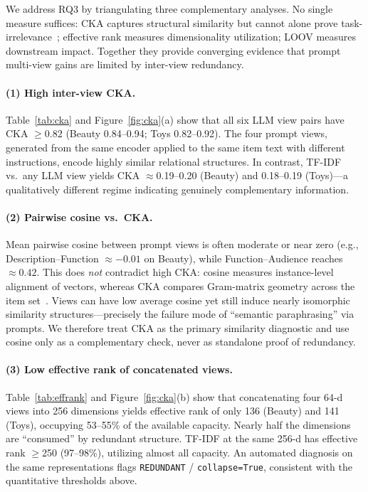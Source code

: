 \documentclass[sigconf,natbib=true,anonymous]{acmart}
\begin{document}
We address RQ3 by triangulating three complementary analyses.
No single measure suffices: CKA captures structural similarity but cannot alone prove task-irrelevance~\cite{kornblith2019cka}; effective rank measures dimensionality utilization; LOOV measures downstream impact.
Together they provide converging evidence that prompt multi-view gains are limited by inter-view redundancy.

\paragraph{(1) High inter-view CKA.}
Table~\ref{tab:cka} and Figure~\ref{fig:cka}(a) show that all six LLM view pairs have CKA $\ge 0.82$ (Beauty 0.84--0.94; Toys 0.82--0.92).
The four prompt views, generated from the same encoder applied to the same item text with different instructions, encode highly similar relational structures.
In contrast, TF-IDF vs.\ any LLM view yields CKA $\approx$0.19--0.20 (Beauty) and 0.18--0.19 (Toys)---a qualitatively different regime indicating genuinely complementary information.

\paragraph{(2) Pairwise cosine vs.\ CKA.}
Mean pairwise cosine between prompt views is often moderate or near zero (e.g., Description--Function $\approx -0.01$ on Beauty), while Function--Audience reaches $\approx 0.42$.
This does \emph{not} contradict high CKA: cosine measures instance-level alignment of vectors, whereas CKA compares Gram-matrix geometry across the item set~\cite{kornblith2019cka}.
Views can have low average cosine yet still induce nearly isomorphic similarity structures---precisely the failure mode of ``semantic paraphrasing'' via prompts.
We therefore treat CKA as the primary similarity diagnostic and use cosine only as a complementary check, never as standalone proof of redundancy.

\paragraph{(3) Low effective rank of concatenated views.}
Table~\ref{tab:effrank} and Figure~\ref{fig:cka}(b) show that concatenating four 64-d views into 256 dimensions yields effective rank of only 136 (Beauty) and 141 (Toys), occupying 53--55\% of the available capacity.
Nearly half the dimensions are ``consumed'' by redundant structure.
TF-IDF at the same 256-d has effective rank $\ge$250 (97--98\%), utilizing almost all capacity.
An automated diagnosis on the same representations flags \texttt{REDUNDANT} / \texttt{collapse=True}, consistent with the quantitative thresholds above.
\end{document}
